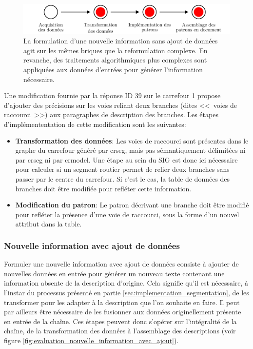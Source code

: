 \begin{figure}
    \centering
    \includegraphics[width=\textwidth]{images/evaluation/pipeline/pipeline_reformulation_complexe.pdf}
    \caption[Formulation d'une nouvelle information sans ajout de données dans la chaîne de description]{La formulation d'une nouvelle information sans ajout de données agit sur les mêmes briques que la reformulation complexe. En revanche, des traitements algorithmiques plus complexes sont appliquées aux données d'entrées pour générer l'information nécessaire.}
    \label{fig:evaluation_nouvelle_information_sans_ajout}
\end{figure}

\newpar{}

Une modification fournie par la réponse ID 39 sur le carrefour 1 propose d'ajouter des précisions sur les voies reliant deux branches (dites <<~voies de raccourci~>>) aux paragraphes de description des branches. Les étapes d'implémententation de cette modification sont les suivantes:

\begin{itemize}
    \item \textbf{Transformation des données}: Les voies de raccourci sont présentes dans le graphe du carrefour généré par crseg, mais pas sémantiquement délimitées ni par crseg ni par crmodel. Une étape au sein du SIG est donc ici nécessaire pour calculer si un segment routier permet de relier deux branches sans passer par le centre du carrefour. Si c'est le cas, la table de données des branches doit être modifiée pour refléter cette information.
    \item \textbf{Modification du patron}: Le patron décrivant une branche doit être modifié pour refléter la présence d'une voie de raccourci, sous la forme d'un nouvel attribut dans la table.
\end{itemize}

\subsubsection{Nouvelle information avec ajout de données}

Formuler une nouvelle information avec ajout de données consiste à ajouter de nouvelles données en entrée pour générer un nouveau texte contenant une information absente de la description d'origine. Cela signifie qu'il est nécessaire, à l'instar du processus présenté en partie \ref{sec:implementation_segmentation}, de les transformer pour les adapter à la description que l'on souhaite en faire. Il peut par ailleurs être nécessaire de les fusionner aux données originellement présente en entrée de la chaîne. Ces étapes peuvent  donc s'opérer sur l'intégralité de la chaîne, de la transformation des données à l'assemblage des descriptions (voir figure \ref{fig:evaluation_nouvelle_information_avec_ajout}).

